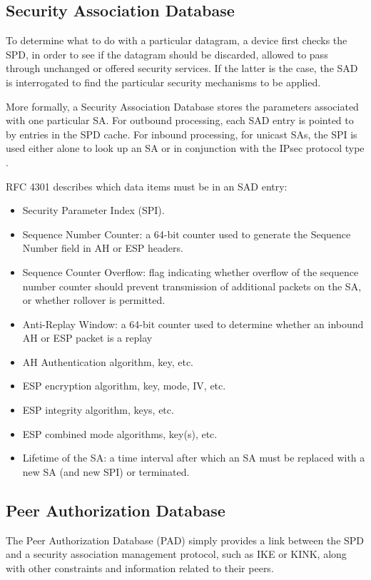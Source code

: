 \documentclass[a4paper,12pt]{report}
\begin{document}
	\subsection{Security Association Database}
		To determine what to do with a particular datagram, a device first checks the SPD, in order to see if the datagram should be discarded, allowed to pass through unchanged or offered security services. If the latter is the case, the SAD is interrogated to find the particular security mechanisms to be applied.
		
		More formally, a Security Association Database stores the parameters associated
with one particular SA. For outbound processing, each SAD entry is pointed to by entries in the SPD cache.  For inbound processing, for unicast SAs, the SPI is used either alone to look up an SA or in conjunction with the IPsec protocol type \cite{rfc4301}.

	RFC 4301 describes which data items must be in an SAD entry:
	\begin{itemize}
		\item Security Parameter Index (SPI).
		\item Sequence Number Counter: a 64-bit counter used to generate the Sequence Number field in AH or ESP headers.
		\item Sequence Counter Overflow: flag indicating whether overflow of the sequence number counter should prevent transmission of additional packets on the SA, or whether rollover is permitted.
		\item Anti-Replay Window: a 64-bit counter used to determine whether an inbound AH or ESP packet is a replay
		\item AH Authentication algorithm, key, etc.
		\item ESP encryption algorithm, key, mode, IV, etc.
		\item ESP integrity algorithm, keys, etc.
		\item ESP combined mode algorithms, key(s), etc.
		\item Lifetime of the SA: a time interval after which an SA must be replaced with a new SA (and new SPI) or terminated.
	\end{itemize}
	
	\subsection{Peer Authorization Database}
	The Peer Authorization Database (PAD) simply provides a link between the SPD and a security association management protocol, such as IKE or KINK, along with other constraints and information related to their peers.
	
\end{document}

